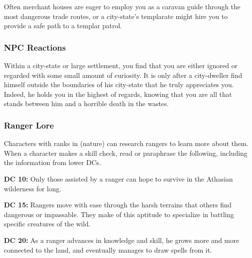 Often merchant houses are eager to employ you as a caravan guide through the most dangerous trade routes, or a city-state's templarate might hire you to provide a safe path to a templar patrol.

\subsubsection{NPC Reactions}
Within a city-state or large settlement, you find that you are either ignored or regarded with some small amount of curiosity. It is only after a city-dweller find himself outside the boundaries of his city-state that he truly appreciates you. Indeed, he holds you in the highest of regards, knowing that you are all that stands between him and a horrible death in the wastes.

\subsubsection{Ranger Lore}
Characters with ranks in  (nature) can research rangers to learn more about them. When a character makes a skill check, read or paraphrase the following, including the information from lower DCs.

\textbf{DC 10:} Only those assisted by a ranger can hope to survive in the Athasian wilderness for long.

\textbf{DC 15:} Rangers move with ease through the harsh terrains that others find dangerous or impassable. They make of this aptitude to specialize in battling specific creatures of the wild.

\textbf{DC 20:} As a ranger advances in knowledge and skill, he grows more and more connected to the land, and eventually manages to draw spells from it.
